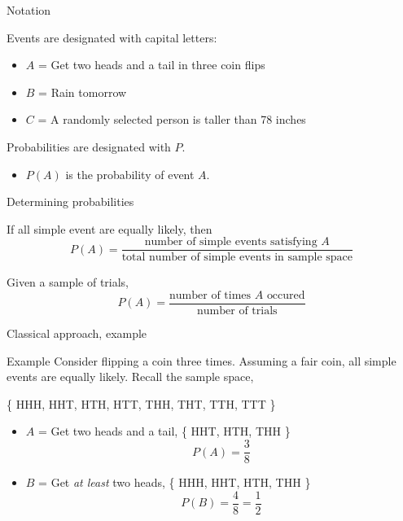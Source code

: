 \documentclass[xcolor=table]{beamer}
\begin{document}
\begin{frame}{Notation}
\begin{block}{}
Events are designated with capital letters:
\pause
\begin{itemize}
\item $A$ = Get two heads and a tail in three coin flips
\item $B$ = Rain tomorrow
\item $C$ = A randomly selected person is taller than 78 inches
\end{itemize}
\end{block}

\begin{block}{}
Probabilities are designated with $P$.
\pause
\begin{itemize}
\item $P(A)$ is the probability of event $A$.
\end{itemize}
\end{block}
\end{frame}

\begin{frame}{Determining probabilities}
\begin{block}{}
 If all simple event are equally likely, then
\[P(A) = \frac{\text{number of simple events satisfying } A}{\text{total number of simple events in sample space}}\] 
\end{block}

\pause

\begin{block}{}
 Given a sample of trials,
\[P(A) = \frac{\text{number of times } A \text{ occured}}{\text{number of trials}}\]
\end{block}

\end{frame}

\begin{frame}{Classical approach, example}
\begin{exampleblock}{Example}
Consider flipping a coin three times. Assuming a fair coin, all simple events are equally likely. Recall the sample space,\\
\smallskip
{\centering
\{ HHH, HHT, HTH, HTT, THH, THT, TTH, TTT \} \par
}
\begin{itemize}
\pause
\item $A$ = Get two heads and a tail, \{ HHT, HTH, THH \}
\pause
\[ P(A) = \frac 3 8\]

\pause
\item $B$ = Get \emph{at least} two heads,  \{ HHH,  HHT, HTH, THH \}
\pause
\[ P(B) = \frac 4 8 = \frac 1 2\]
\end{itemize}
\end{exampleblock}
\end{frame}
\end{document}
